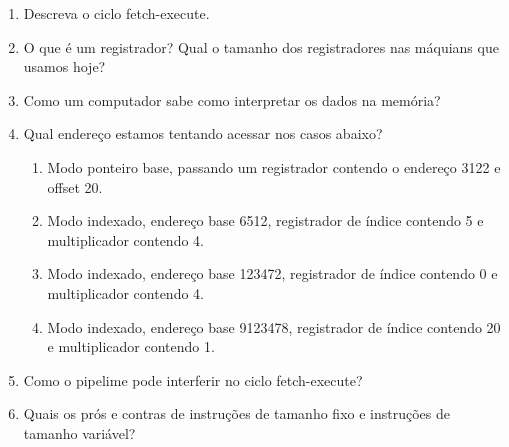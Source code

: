 \begin{enumerate}

\item Descreva o ciclo fetch-execute.

\item O que é um registrador? Qual o tamanho dos registradores nas máquians que usamos hoje?

\item Como um computador sabe como interpretar os dados na memória?

\item Qual endereço estamos tentando acessar nos casos abaixo?
	\begin{enumerate}
	
	\item Modo ponteiro base, passando um registrador contendo o endereço 3122 e offset 20.
	
	\item Modo indexado, endereço base 6512, registrador de índice contendo 5 e multiplicador contendo 4.
	
	\item Modo indexado, endereço base 123472, registrador de índice contendo 0 e multiplicador contendo 4.
	
	\item Modo indexado, endereço base 9123478, registrador de índice contendo 20 e multiplicador contendo 1.
	
	\end{enumerate}

\item Como o pipelime pode interferir no ciclo fetch-execute?

\item Quais os prós e contras de instruções de tamanho fixo e instruções de tamanho variável?

\end{enumerate}